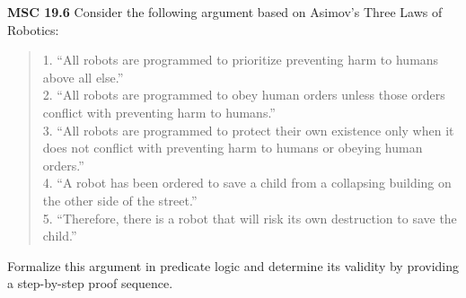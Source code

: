\documentclass[aspectratio=169]{beamer}
\begin{document}
\begin{frame}[plain]{}

{\bf MSC 19.6} 
Consider the following argument based on Asimov's Three Laws of Robotics:
\begin{quote}
1. ``All robots are programmed to prioritize preventing harm to humans above all else.'' \\
2. ``All robots are programmed to obey human orders unless those orders conflict with preventing harm to humans.'' \\
3. ``All robots are programmed to protect their own existence only when it does not conflict with preventing harm to humans or obeying human orders.'' \\
4. ``A robot has been ordered to save a child from a collapsing building on the other side of the street.'' \\
5. ``Therefore, there is a robot that will risk its own destruction to save the child.''
\end{quote}

Formalize this argument in predicate logic and determine its validity by providing a step-by-step proof sequence.

\end{frame}
\end{document}
